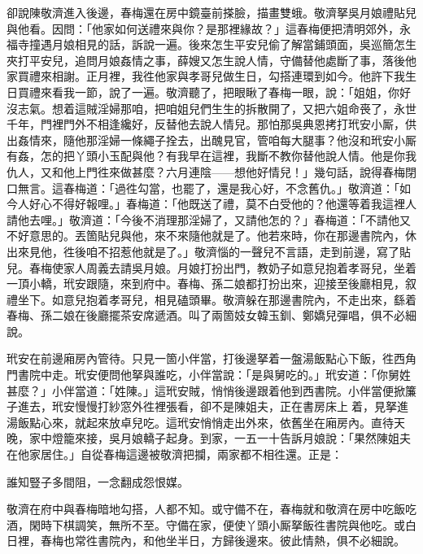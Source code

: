 卻說陳敬濟進入後邊，春梅還在房中鏡臺前搽臉，描畫雙蛾。敬濟拏吳月娘禮貼兒與他看。因問：「他家如何送禮來與你？是那裡緣故？」這春梅便把清明郊外，永福寺撞遇月娘相見的話，訴說一遍。後來怎生平安兒偷了解當鋪頭面，吳巡簡怎生夾打平安兒，追問月娘姦情之事，薛嫂又怎生說人情，守備替他處斷了事，落後他家買禮來相謝。正月裡，我徃他家與孝哥兒做生日，勾搭連環到如今。他許下我生日買禮來看我一節，說了一遍。敬濟聽了，把眼瞅了春梅一眼，說：「姐姐，你好沒志氣。想着這賊淫婦那咱，把咱姐兒們生生的拆散開了，又把六姐命䘮了，永世千年，門裡門外不相逢纔好，反替他去說人情兒。那怕那吳典恩拷打玳安小厮，供出姦情來，隨他那淫婦一條繩子拴去，出醜見官，管咱每大腿事？他沒和玳安小厮有姦，怎的把丫頭小玉配與他？{}有我早在這裡，我斷不教你替他說人情。他是你我仇人，又和他上門徃來做甚麼？六月連陰——想他好情兒！」{}幾句話，說得春梅閉口無言。這春梅道：「過徃勾當，也罷了，還是我心好，不念舊仇。」敬濟道：「如今人好心不得好報哩。」春梅道：「他既送了禮，莫不白受他的？他還等着我這裡人請他去哩。」敬濟道：「今後不消理那淫婦了，又請他怎的？」春梅道：「不請他又不好意思的。丟箇貼兒與他，來不來隨他就是了。他若來時，你在那邊書院內，休出來見他，徃後咱不招惹他就是了。」敬濟惱的一聲兒不言語，走到前邊，寫了貼兒。春梅使家人周義去請吳月娘。月娘打扮出門，教奶子如意兒抱着孝哥兒，坐着一頂小轎，玳安跟隨，來到府中。春梅、孫二娘都打扮出來，迎接至後廳相見，叙禮坐下。如意兒抱着孝哥兒，相見磕頭畢。敬濟躲在那邊書院內，不走出來，繇着春梅、孫二娘在後廳擺茶安席遞酒。叫了兩箇妓女韓玉釧、鄭嬌兒彈唱，俱不必細說。

玳安在前邊廂房內管待。只見一箇小伴當，打後邊拏着一盤湯飯點心下飯，徃西角門書院中走。玳安便問他拏與誰吃，小伴當說：「是與舅吃的。」玳安道：「你舅姓甚麼？」小伴當道：「姓陳。」這玳安賊，悄悄後邊跟着他到西書院。小伴當便掀簾子進去，玳安慢慢打紗窓外徃裡張看，卻不是陳姐夫，正在書房床上𢱉着，見拏進湯飯點心來，就起來放卓兒吃。這玳安悄悄走出外來，依舊坐在廂房內。直待天晚，家中燈籠來接，吳月娘轎子起身。到家，一五一十告訴月娘說：「果然陳姐夫在他家居住。」自從春梅這邊被敬濟把攔，兩家都不相徃還。正是：

\begin{myquote}
誰知豎子多間阻，一念翻成怨恨媒。
\end{myquote}

敬濟在府中與春梅暗地勾搭，人都不知。或守備不在，春梅就和敬濟在房中吃飯吃酒，閑時下棋調笑，無所不至。守備在家，便使丫頭小厮拏飯徃書院與他吃。或白日裡，春梅也常徃書院內，和他坐半日，方歸後邊來。彼此情熱，俱不必細說。

